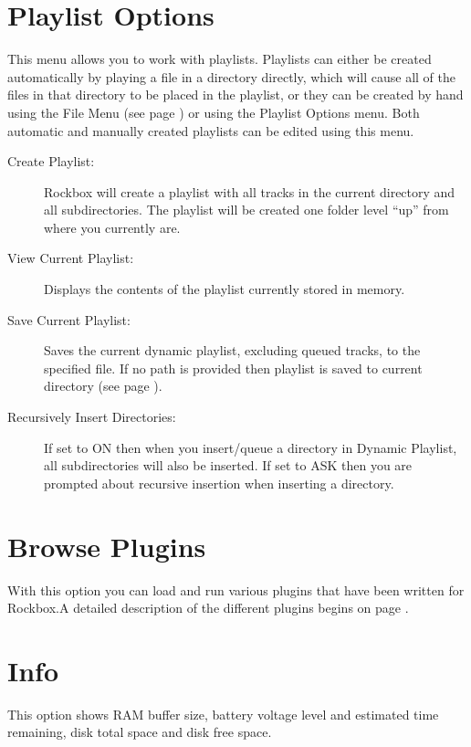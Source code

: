 \section{\label{ref:playlistoptions}Playlist Options}
This menu allows you to work with playlists. Playlists can either be created
automatically by playing a file in a directory directly, which will cause all 
of the files in that directory to be placed in the playlist, or they can be
created by hand using the File Menu (see page \pageref{ref:Filemenu}) or using 
the Playlist Options menu.  Both  automatic and manually created playlists 
can be edited using this menu.

\begin{description}
\item[Create Playlist:]
  Rockbox will create a playlist with all tracks in the current directory 
and all subdirectories. The playlist will be created one folder level ``up'' 
from where you currently are.
  
\item[View Current Playlist:]
  Displays the contents of the playlist currently stored in memory.
  
\item[Save Current Playlist:]
  Saves the current dynamic playlist, excluding queued tracks, to the 
specified file. If no path is provided then playlist is saved to current 
directory (see page \pageref{ref:Playlistsubmenu}).
  
\item[Recursively Insert Directories:]
  If set to ON then when you insert/queue a directory in Dynamic Playlist, 
all subdirectories will also be inserted. If set to ASK then you are prompted 
about recursive insertion when inserting a directory.
\end{description}

\section{Browse Plugins}
With this option you can load and run various plugins that have been 
written for Rockbox.A detailed description of the different plugins begins 
on page \pageref{ref:plugins}.

\section{\label{ref:Info}Info}
This option shows RAM buffer size, battery voltage level and estimated time 
remaining, disk total space and disk free space.


